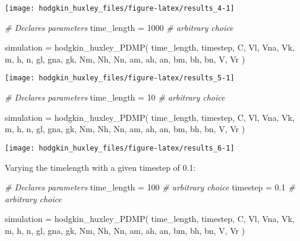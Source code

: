 \documentclass[
]{article}
\newenvironment{Shaded}{\begin{snugshade}}{\end{snugshade}}
\newcommand{\CommentTok}[1]{\textcolor[rgb]{0.56,0.35,0.01}{\textit{#1}}}
\newcommand{\DecValTok}[1]{\textcolor[rgb]{0.00,0.00,0.81}{#1}}
\newcommand{\FloatTok}[1]{\textcolor[rgb]{0.00,0.00,0.81}{#1}}
\newcommand{\FunctionTok}[1]{\textcolor[rgb]{0.00,0.00,0.00}{#1}}
\newcommand{\NormalTok}[1]{#1}
\newcommand{\OtherTok}[1]{\textcolor[rgb]{0.56,0.35,0.01}{#1}}
\begin{document}
\texttt{[image: hodgkin\_huxley\_files/figure-latex/results\_4-1]}

\begin{Shaded}
\begin{Highlighting}[]
\CommentTok{\# Declares parameters}
\NormalTok{time\_length }\OtherTok{=} \DecValTok{1000}  \CommentTok{\# arbitrary choice}

\NormalTok{simulation }\OtherTok{=} \FunctionTok{hodgkin\_huxley\_PDMP}\NormalTok{(}
\NormalTok{  time\_length, timestep,}
\NormalTok{  C, }
\NormalTok{  Vl, Vna, Vk, }
\NormalTok{  m, h, n,}
\NormalTok{  gl, gna, gk,}
\NormalTok{  Nm, Nh, Nn,}
\NormalTok{  am, ah, an, bm, bh, bn,}
\NormalTok{  V, Vr}
\NormalTok{)}
\end{Highlighting}
\end{Shaded}

\texttt{[image: hodgkin\_huxley\_files/figure-latex/results\_5-1]}

\begin{Shaded}
\begin{Highlighting}[]
\CommentTok{\# Declares parameters}
\NormalTok{time\_length }\OtherTok{=} \DecValTok{10}    \CommentTok{\# arbitrary choice}

\NormalTok{simulation }\OtherTok{=} \FunctionTok{hodgkin\_huxley\_PDMP}\NormalTok{(}
\NormalTok{  time\_length, timestep,}
\NormalTok{  C, }
\NormalTok{  Vl, Vna, Vk, }
\NormalTok{  m, h, n,}
\NormalTok{  gl, gna, gk,}
\NormalTok{  Nm, Nh, Nn,}
\NormalTok{  am, ah, an, bm, bh, bn,}
\NormalTok{  V, Vr}
\NormalTok{)}
\end{Highlighting}
\end{Shaded}

\texttt{[image: hodgkin\_huxley\_files/figure-latex/results\_6-1]}

Varying the timelength with a given timestep of 0.1:

\begin{Shaded}
\begin{Highlighting}[]
\CommentTok{\# Declares parameters}
\NormalTok{time\_length }\OtherTok{=} \DecValTok{100}   \CommentTok{\# arbitrary choice}
\NormalTok{timestep    }\OtherTok{=} \FloatTok{0.1} \CommentTok{\# arbitrary choice}

\NormalTok{simulation }\OtherTok{=} \FunctionTok{hodgkin\_huxley\_PDMP}\NormalTok{(}
\NormalTok{  time\_length, timestep,}
\NormalTok{  C, }
\NormalTok{  Vl, Vna, Vk, }
\NormalTok{  m, h, n,}
\NormalTok{  gl, gna, gk,}
\NormalTok{  Nm, Nh, Nn,}
\NormalTok{  am, ah, an, bm, bh, bn,}
\NormalTok{  V, Vr}
\NormalTok{)}
\end{Highlighting}
\end{Shaded}
\end{document}
